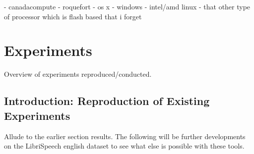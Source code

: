 \documentclass[twoside,11pt]{article}
\begin{document}
- canadacompute
- roquefort
- os x
- windows
- intel/amd linux
- that other type of processor which is flash based that i forget

\section{Experiments}

Overview of experiments reproduced/conducted.

\subsection{Introduction: Reproduction of Existing Experiments}

Allude to the earlier section results. The following will be further developments on the LibriSpeech english dataset to see what else is possible with these tools.
\end{document}
